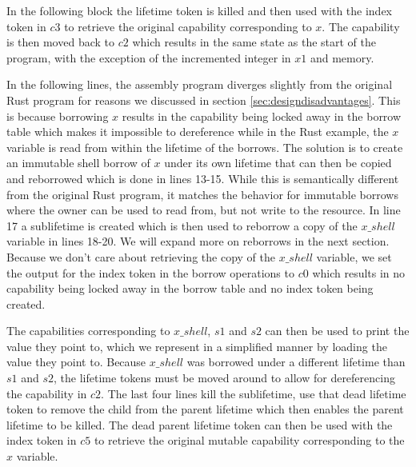In the following block the lifetime token is killed and then used with the index token in $c3$ to retrieve the original capability corresponding to $x$.
The capability is then moved back to $c2$ which results in the same state as the start of the program, with the exception of the incremented integer in $x1$ and memory.

In the following lines, the assembly program diverges slightly from the original Rust program for reasons we discussed in section \ref{sec:designdisadvantages}.
This is because borrowing $x$ results in the capability being locked away in the borrow table which makes it impossible to dereference while in the Rust example, the $x$ variable is read from within the lifetime of the borrows.
The solution is to create an immutable shell borrow of $x$ under its own lifetime that can then be copied and reborrowed which is done in lines 13-15.
While this is semantically different from the original Rust program, it matches the behavior for immutable borrows where the owner can be used to read from, but not write to the resource.
In line 17 a sublifetime is created which is then used to reborrow a copy of the $x\_shell$ variable in lines 18-20.
We will expand more on reborrows in the next section.
Because we don't care about retrieving the copy of the $x\_shell$ variable, we set the output for the index token in the borrow operations to $c0$ which results in no capability being locked away in the borrow table and no index token being created.

The capabilities corresponding to $x\_shell$, $s1$ and $s2$ can then be used to print the value they point to, which we represent in a simplified manner by loading the value they point to.
Because $x\_shell$ was borrowed under a different lifetime than $s1$ and $s2$, the lifetime tokens must be moved around to allow for dereferencing the capability in $c2$.
The last four lines kill the sublifetime, use that dead lifetime token to remove the child from the parent lifetime which then enables the parent lifetime to be killed.
The dead parent lifetime token can then be used with the index token in $c5$ to retrieve the original mutable capability corresponding to the $x$ variable.

